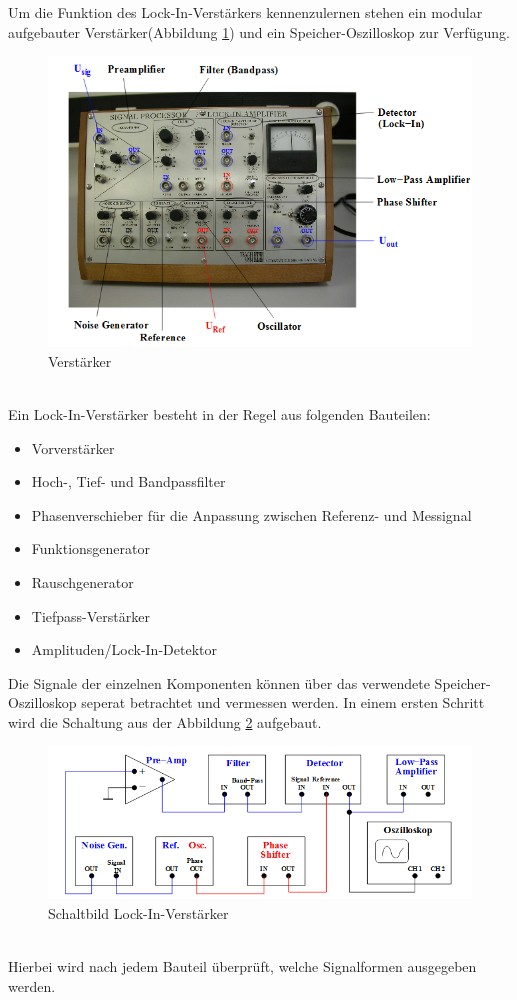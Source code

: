 Um die Funktion des Lock-In-Verstärkers kennenzulernen stehen ein modular
aufgebauter Verstärker(Abbildung \ref{fig:verstärker}) und ein
Speicher-Oszilloskop zur Verfügung.
\begin{figure}[h]
  \centering
  \includegraphics[width=\textwidth]{Bilder/Verstaerker.jpeg}
  \caption{Verstärker}
  \label{fig:verstärker}
\end{figure}
\\
Ein Lock-In-Verstärker besteht in der Regel aus folgenden Bauteilen:
\begin{itemize}
  \item Vorverstärker
  \item Hoch-, Tief- und Bandpassfilter
  \item Phasenverschieber für die Anpassung zwischen Referenz- und Messignal
  \item Funktionsgenerator
  \item Rauschgenerator
  \item Tiefpass-Verstärker
  \item Amplituden/Lock-In-Detektor
\end{itemize}
Die Signale der einzelnen Komponenten können über das verwendete
Speicher-Oszilloskop seperat betrachtet und vermessen werden.
In einem ersten Schritt wird die Schaltung aus der Abbildung \ref{fig:schalt}
aufgebaut.
\begin{figure}[h]
  \centering
  \includegraphics[width=\textwidth]{Bilder/Schaltung.jpeg}
  \caption{Schaltbild Lock-In-Verstärker}
  \label{fig:schalt}
\end{figure}
\\
Hierbei wird nach jedem Bauteil überprüft, welche Signalformen ausgegeben werden.
